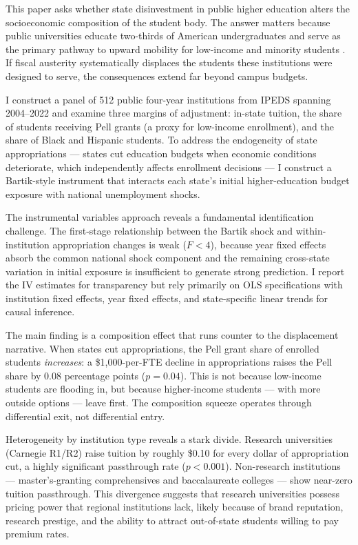 \documentclass[12pt]{article}
\begin{document}
This paper asks whether state disinvestment in public higher education alters the socioeconomic composition of the student body. The answer matters because public universities educate two-thirds of American undergraduates and serve as the primary pathway to upward mobility for low-income and minority students \citep{chetty2017mobility}. If fiscal austerity systematically displaces the students these institutions were designed to serve, the consequences extend far beyond campus budgets.

I construct a panel of 512 public four-year institutions from IPEDS spanning 2004--2022 and examine three margins of adjustment: in-state tuition, the share of students receiving Pell grants (a proxy for low-income enrollment), and the share of Black and Hispanic students. To address the endogeneity of state appropriations --- states cut education budgets when economic conditions deteriorate, which independently affects enrollment decisions --- I construct a Bartik-style instrument that interacts each state's initial higher-education budget exposure with national unemployment shocks.

The instrumental variables approach reveals a fundamental identification challenge. The first-stage relationship between the Bartik shock and within-institution appropriation changes is weak ($F < 4$), because year fixed effects absorb the common national shock component and the remaining cross-state variation in initial exposure is insufficient to generate strong prediction. I report the IV estimates for transparency but rely primarily on OLS specifications with institution fixed effects, year fixed effects, and state-specific linear trends for causal inference.

The main finding is a composition effect that runs counter to the displacement narrative. When states cut appropriations, the Pell grant share of enrolled students \textit{increases}: a \$1,000-per-FTE decline in appropriations raises the Pell share by 0.08 percentage points ($p = 0.04$). This is not because low-income students are flooding in, but because higher-income students --- with more outside options --- leave first. The composition squeeze operates through differential exit, not differential entry.

Heterogeneity by institution type reveals a stark divide. Research universities (Carnegie R1/R2) raise tuition by roughly \$0.10 for every dollar of appropriation cut, a highly significant passthrough rate ($p < 0.001$). Non-research institutions --- master's-granting comprehensives and baccalaureate colleges --- show near-zero tuition passthrough. This divergence suggests that research universities possess pricing power that regional institutions lack, likely because of brand reputation, research prestige, and the ability to attract out-of-state students willing to pay premium rates.
\end{document}
